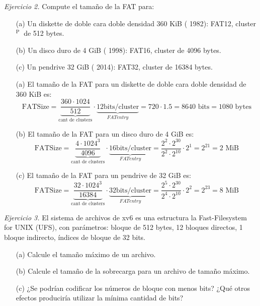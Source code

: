 \documentclass[12pt]{article}
\begin{document}
\noindent \textit{Ejercicio 2.} Compute el tamaño de la FAT para:

\begin{itemize}
    \item[(a)] Un diskette de doble cara doble densidad 360 KiB ( 1982): FAT12, cluster ${ }^{\text {P }}$ de 512 bytes.
    \item[(b)] Un disco duro de 4 GiB ( 1998): FAT16, cluster de 4096 bytes.
    \item[(c)] Un pendrive 32 GiB ( 2014): FAT32, cluster de 16384 bytes.
\end{itemize}

\begin{rta}
    \begin{itemize}
        \item[(a)] El tamaño de la FAT para un diskette de doble cara doble densidad de 360 KiB es:
        \begin{equation*}
            \text{FATSize} = \underbrace{\frac{360 \cdot 1024}{512}}_{\text{cant de clusters}} \cdot \underbrace{12 \text{bits/cluster}}_{FAT entry} = 720 \cdot 1.5 = 8640 \text{ bits} = 1080 \text{ bytes}
        \end{equation*}
        \item[(b)] El tamaño de la FAT para un disco duro de 4 GiB es:
        \begin{equation*}
            \text{FATSize} = \underbrace{\frac{4 \cdot 1024^3}{4096}}_{\text{cant de clusters}} \cdot \underbrace{16 \text{bits/cluster}}_{FAT entry} = \frac{2^2 \cdot 2^{30}}{2^2 \cdot 2^{10}} \cdot 2^1 = 2^21 = 2 \text{ MiB} 
        \end{equation*}
        \item[(c)] El tamaño de la FAT para un pendrive de 32 GiB es:
        \begin{equation*}
            \text{FATSize} = \underbrace{\frac{32 \cdot 1024^3}{16384}}_{\text{cant de clusters}} \cdot \underbrace{32 \text{bits/cluster}}_{FAT entry} = \frac{2^5 \cdot 2^{30}}{2^4 \cdot 2^{10}} \cdot 2^2 = 2^23 = 8 \text{ MiB}
        \end{equation*} 
    \end{itemize}
\end{rta}

\noindent \textit{Ejercicio 3.} El sistema de archivos de xv6 es una estructura la Fast-Filesystem for UNIX (UFS), con parámetros: bloque de 512 bytes, 12 bloques directos, 1 bloque indirecto, índices de bloque de 32 bits.

\begin{itemize}
    \item[(a)] Calcule el tamaño máximo de un archivo.
    \item[(b)] Calcule el tamaño de la sobrecarga para un archivo de tamaño máximo.
    \item[(c)] ¿Se podrían codificar los números de bloque con menos bits? ¿Qué otros efectos produciría utilizar la mínima cantidad de bits?
\end{itemize}
\end{document}
